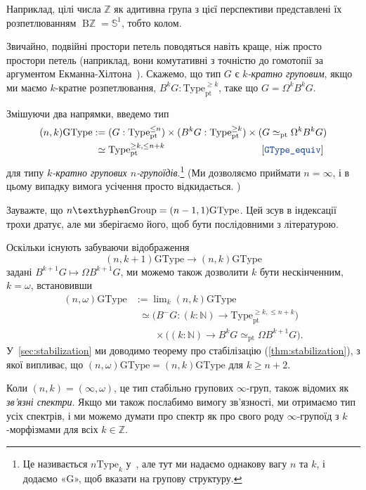 \documentclass[12pt]{article}
\newcommand*{\Loop}{\Omega}
\newcommand*{\bN}{{\mathbb{N}}}
\newcommand*{\bZ}{{\mathbb{Z}}}
\newcommand*{\bS}{{\mathbb{S}}}
\newcommand*{\pt}{{\mathrm{pt}}}
\renewcommand*{\equiv}{\mathrel{\simeq}}
\newcommand*\BZ{\mathop{\mathrm{B}\bZ}}
\newcommand*{\Type}{\mathrm{Type}}
\newcommand*{\GType}{\mathrm{GType}}
\newcommand*{\Grp}{\mathrm{\texthyphen Group}}
\newcommand*{\leanref}[1]{{\normalfont[\texttt{\color{DarkBlue}#1}]}}
\begin{document}
Наприклад, цілі числа $\bZ$ як адитивна група з цієї перспективи представлені їх розпетлюванням $\BZ = \bS^1$, тобто колом.

Звичайно, подвійні простори петель поводяться навіть краще, ніж просто простори петель (наприклад, вони комутативні з точністю до гомотопії за аргументом Екманна-Хілтона~\cite[Теорема~2.1.6]{TheBook}). Скажемо, що тип $G$ є \emph{$k$-кратно груповим}, якщо ми маємо $k$-кратне розпетлювання, $B^k G : \Type_\pt^{\ge k}$, таке що $G = \Loop^k B^k G$.

Змішуючи два напрямки, введемо тип
\begin{align*}
  (n,k)\GType
  &:= (G : \Type_\pt^{\le n}) \times (B^k G : \Type_\pt^{\ge k})
    \times (G \equiv_\pt \Loop^k B^k G) \\
  &\omit$\phantom{:}\equiv \Type_\pt^{\ge k,\le n+k}$\hfill\text{\leanref{GType\_equiv}}
\end{align*}
для типу \emph{$k$-кратно групових $n$-групоїдів}.\footnote{Це називається $n\Type_k$ у~\cite{BaezDolan1998}, але тут ми надаємо однакову вагу $n$ та $k$, і додаємо «G», щоб вказати на групову структуру.} (Ми дозволяємо приймати $n = \infty$, і в цьому випадку вимога усічення просто відкидається. \leanref{InfGType\_equiv})

Зауважте, що $n\Grp = (n-1,1)\GType$. Цей зсув в індексації трохи дратує, але ми зберігаємо його, щоб бути послідовними з літературою.

Оскільки існують забуваючи відображення
\begin{equation*}
(n,k+1)\GType \to (n,k)\GType
\end{equation*}
задані $B^{k+1} G \mapsto \Loop B^{k+1} G$, ми можемо також дозволити $k$ бути нескінченним, $k = \omega$, встановивши
\begin{align*}
(n,\omega)\GType & := \lim\nolimits_k (n,k)\GType \\
&\phantom{:}\equiv \bigl(B^{-} G : (k : \bN) \to \Type_\pt^{\ge k,\le n+k}\bigr) \\
  &\qquad \times \bigl((k : \bN) \to B^k G \equiv_\pt \Loop B^{k+1} G \bigr).
\end{align*}
У~\autoref{sec:stabilization} ми доводимо теорему про стабілізацію (\autoref{thm:stabilization}), з якої випливає, що $(n,\omega)\GType = (n,k)\GType$ для $k \ge n+2$.

Коли $(n,k) = (\infty,\omega)$, це тип стабільно групових $\infty$-груп, також відомих як \emph{зв'язні спектри}. Якщо ми також послабимо вимогу зв'язності, ми отримаємо тип усіх спектрів, і ми можемо думати про спектр як про свого роду $\infty$-групоїд з $k$-морфізмами для всіх $k \in \bZ$.
\end{document}
